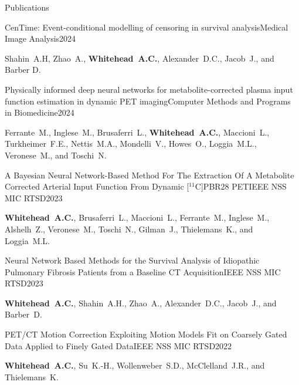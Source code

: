 \documentclass{cv}
\begin{document}
\begin{spacing}{1.0}
\begin{rSection}{Publications}
            \item \begin{rSubsection}{CenTime: Event-conditional modelling of censoring in survival analysis}{}{Medical Image Analysis}{2024}
                \item Shahin~A.H, Zhao~A., \textbf{Whitehead~A.C.}, Alexander~D.C., Jacob~J., and Barber D.
            \end{rSubsection}
    
            \item \begin{rSubsection}{Physically informed deep neural networks for metabolite-corrected plasma input function estimation in dynamic PET imaging}{}{Computer Methods and Programs in Biomedicine}{2024}
                \item Ferrante~M., Inglese~M., Brusaferri~L., \textbf{Whitehead~A.C.}, Maccioni~L., Turkheimer~F.E., Nettis~M.A., Mondelli~V., Howes~O., Loggia~M.L., Veronese~M., and Toschi~N.
            \end{rSubsection}
    
            \item \begin{rSubsection}{A Bayesian Neural Network-Based Method For The Extraction Of A Metabolite Corrected Arterial Input Function From Dynamic [$^{11}$C]PBR28 PET}{}{IEEE NSS MIC RTSD}{2023}
                \item \textbf{Whitehead~A.C.}, Brusaferri~L., Maccioni~L., Ferrante~M., Inglese~M., Alshelh~Z., Veronese~M., Toschi~N., Gilman~J., Thielemans~K., and Loggia~M.L.
            \end{rSubsection}
    
            \item \begin{rSubsection}{Neural Network Based Methods for the Survival Analysis of Idiopathic Pulmonary Fibrosis Patients from a Baseline CT Acquisition}{}{IEEE NSS MIC RTSD}{2023}
                \item \textbf{Whitehead~A.C.}, Shahin~A.H., Zhao~A., Alexander~D.C., Jacob~J., and Barber~D.
            \end{rSubsection}
            
            \item \begin{rSubsection}{PET/CT Motion Correction Exploiting Motion Models Fit on Coarsely Gated Data Applied to Finely Gated Data}{}{IEEE NSS MIC RTSD}{2022}
                \item \textbf{Whitehead~A.C.}, Su~K.-H., Wollenweber~S.D., McClelland~J.R., and Thielemans~K.
            \end{rSubsection}
            

\end{rSection}
\end{spacing}
\end{document}
